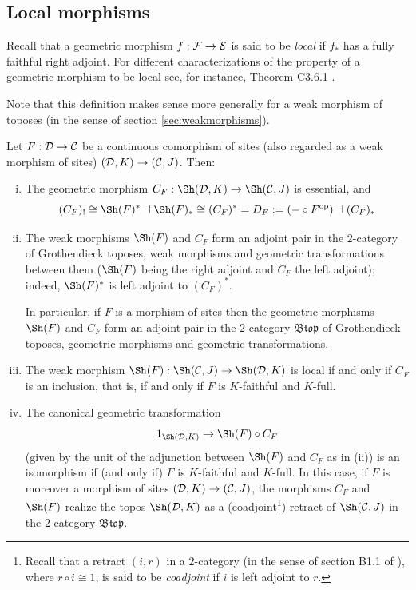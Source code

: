\documentclass[a4paper,12pt]{article}
\begin{document}
\subsection{Local morphisms}\label{sec:localmorphisms}


Recall that a geometric morphism $f:{\cal F}\to {\cal E}$ is said to be \emph{local} if $f_{\ast}$ has a fully faithful right adjoint. For different characterizations of the property of a geometric morphism to be local see, for instance, Theorem C3.6.1 \cite{El}.

Note that this definition makes sense more generally for a weak morphism of toposes (in the sense of section \ref{sec:weakmorphisms}).
 
\begin{theorem}
	Let $F:{\cal D}\to {\cal C}$ be a continuous comorphism of sites (also regarded as a weak morphism of sites) $({\cal D}, K)\to ({\cal C}, J)$. Then:
	\begin{enumerate}[(i)]
		\item The geometric morphism $C_{F}:\Sh({\cal D}, K)\to \Sh({\cal C}, J)$ is essential, and 
		\[
		(C_{F})_{!}\cong \Sh(F)^{\ast} \dashv \Sh(F)_{\ast}\cong (C_{F})^{\ast}=D_{F}:=(-\circ F^{\textup{op}}) \dashv (C_{F})_{\ast}
		\]
		
		\item The weak morphisms $\Sh(F)$ and $C_{F}$ form an adjoint pair in the $2$-category of Grothendieck toposes, weak morphisms and geometric transformations between them ($\Sh(F)$ being the right adjoint and $C_{F}$ the left adjoint); indeed, $\Sh(F)^{\ast}$ is left adjoint to $(C_{F})^{\ast}$. 
		
		In particular, if $F$ is a morphism of sites then the geometric morphisms $\Sh(F)$ and $C_{F}$ form an adjoint pair in the $2$-category $\mathfrak{Btop}$ of Grothendieck toposes, geometric morphisms and geometric transformations. 
		
		\item The weak morphism $\Sh(F):\Sh({\cal C}, J) \to \Sh({\cal D}, K)$ is local if and only if $C_{F}$ is an inclusion, that is, if and only if $F$ is $K$-faithful and $K$-full. 
		
		\item The canonical geometric transformation 
		\[
		1_{\Sh({\cal D}, K)} \to \Sh(F)\circ C_{F}
		\] 
		(given by the unit of the adjunction between $\Sh(F)$ and $C_{F}$  as in (ii)) is an isomorphism if (and only if) $F$ is $K$-faithful and $K$-full. In this case, if $F$ is moreover a morphism of sites $({\cal D}, K)\to ({\cal C}, J)$, the morphisms $C_{F}$ and $\Sh(F)$ realize the topos $\Sh({\cal D}, K)$ as a (coadjoint\footnote{Recall that a retract $(i, r)$ in a $2$-category (in the sense of section B1.1 of \cite{El}), where $r\circ i\cong 1$, is said to be \emph{coadjoint} if $i$ is left adjoint to $r$.}) retract of $\Sh({\cal C}, J)$ in the $2$-category $\mathfrak{Btop}$.		
	\end{enumerate} 
\end{theorem}
\end{document}
